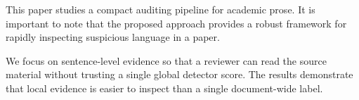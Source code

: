 This paper studies a compact auditing pipeline for academic prose. It is important to note that the proposed approach provides a robust framework for rapidly inspecting suspicious language in a paper.

We focus on sentence-level evidence so that a reviewer can read the source material without trusting a single global detector score. The results demonstrate that local evidence is easier to inspect than a single document-wide label.
